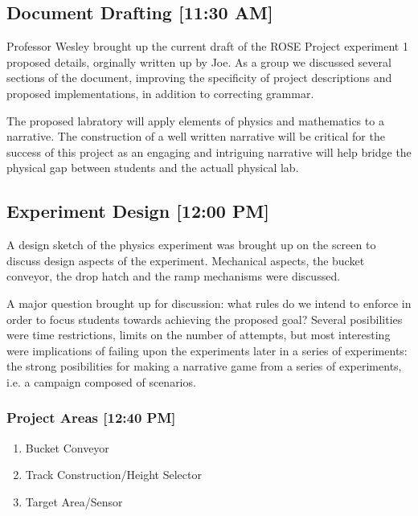 \documentclass{article}
\begin{document}
\subsection{Document Drafting [11:30 AM]}
Professor Wesley brought up the current draft of the ROSE Project experiment 1 proposed details, orginally written up by Joe. As a group we discussed several sections of the document, improving the specificity of project descriptions and proposed implementations, in addition to correcting grammar. 

The proposed labratory will apply elements of physics and mathematics to a narrative. The construction of a well written narrative will be critical for the success of this project as an engaging and intriguing narrative will help bridge the physical gap between students and the actuall physical lab.

\subsection{Experiment Design [12:00 PM]}
A design sketch of the physics experiment was brought up on the screen to discuss design aspects of the experiment. Mechanical aspects, the bucket conveyor, the drop hatch and the ramp mechanisms were discussed.

A major question brought up for discussion: what rules do we intend to enforce in order to focus students towards achieving the proposed goal? Several posibilities were time restrictions, limits on the number of attempts, but most interesting were implications of failing upon the experiments later in a series of experiments: the strong posibilities for making a narrative game from a series of experiments, i.e. a campaign composed of scenarios.

\subsubsection{Project Areas [12:40 PM]}
\begin{enumerate}
    \item Bucket Conveyor
    \item Track Construction/Height Selector
    \item Target Area/Sensor
\end{enumerate}

\end{document}
